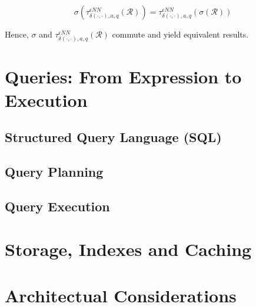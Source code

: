 \begin{equation}
    \sigma(\tau^{\epsilon NN}_{\delta(\cdot,\cdot),a,q}(\mathcal{R})) = \tau^{\epsilon NN}_{\delta(\cdot,\cdot),a,q}(\sigma(\mathcal{R}))
\end{equation}

Hence, $\sigma$ and $\tau^{\epsilon NN}_{\delta(\cdot,\cdot),a,q}(\mathcal{R})$ commute and yield equivalent results.

\section{Queries: From Expression to Execution}

\subsection{Structured Query Language (SQL)}

\subsection{Query Planning}

\subsection{Query Execution}

\section{Storage, Indexes and Caching}

\section{Architectual Considerations}
